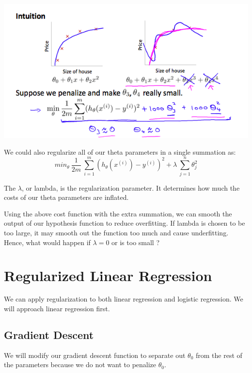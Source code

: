 \documentclass[10pt,a4paper,UTF8]{article}
\begin{document}
\begin{center}
\includegraphics[width=.9\linewidth]{../../img/computer_ng/20171009regularization.png}
\end{center}

We could also regularize all of our theta parameters in a single summation as:
\begin{equation}
\label{eq:6}
min_\theta\ \dfrac{1}{2m}\  \sum_{i=1}^m (h_\theta(x^{(i)}) - y^{(i)})^2 + \lambda\ \sum_{j=1}^n \theta_j^2
\end{equation}

The \(\lambda\), or lambda, is the regularization parameter. It determines how much the costs of our theta parameters are inflated.

Using the above cost function with the extra summation, we can smooth the output of our hypothesis function to reduce overfitting. If lambda is chosen to be too large, it may smooth out the function too much and cause underfitting. Hence, what would happen if \(\lambda =0\) or is too small ?

\section{Regularized Linear Regression}
\label{sec:org4f9b6be}


We can apply regularization to both linear regression and logistic regression. We will approach linear regression first.

\subsection{Gradient Descent}
\label{sec:orga0c9df0}

We will modify our gradient descent function to separate out \(\theta_{0}\) from the rest of the parameters because we do not want to penalize \(\theta_{0}\).
\end{document}
